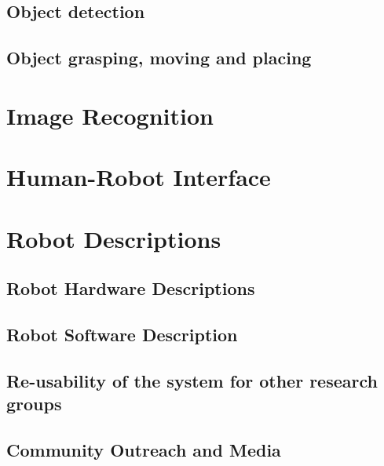 \documentclass[runningheads,a4paper]{llncs}
\begin{document}
\subsection{Object detection}


\subsection{Object grasping, moving and placing}


\section{Image Recognition}


%

\section{Human-Robot Interface}


\section{Robot Descriptions}
\subsection{Robot Hardware Descriptions}


\subsection{Robot Software Description}


\subsection{Re-usability of the system for other research groups}


\subsection{Community Outreach and Media}




\end{document}

